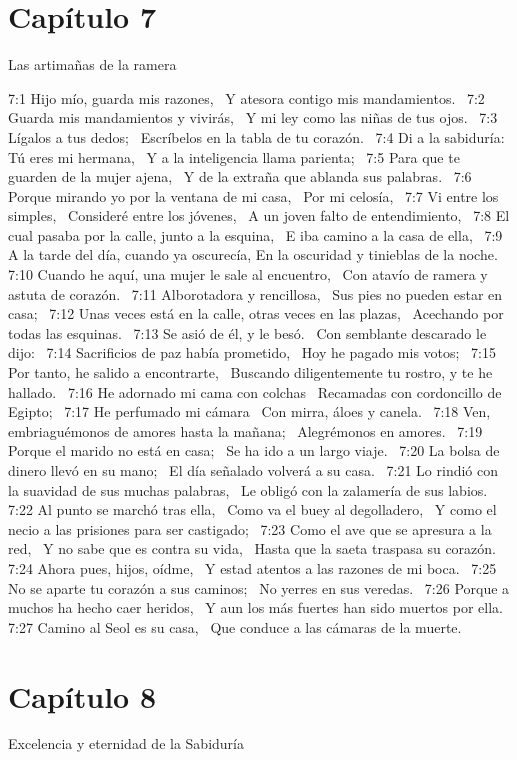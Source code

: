 \section*{Capítulo 7 }
Las artimañas de la ramera  

7:1 Hijo mío, guarda mis razones,  
Y atesora contigo mis mandamientos.  
7:2 Guarda mis mandamientos y vivirás,  
Y mi ley como las niñas de tus ojos.  
7:3 Lígalos a tus dedos;  
Escríbelos en la tabla de tu corazón.  
7:4 Di a la sabiduría: Tú eres mi hermana,  
Y a la inteligencia llama parienta;  
7:5 Para que te guarden de la mujer ajena,  
Y de la extraña que ablanda sus palabras.  
7:6 Porque mirando yo por la ventana de mi casa,  
Por mi celosía,  
7:7 Vi entre los simples,  
Consideré entre los jóvenes,  
A un joven falto de entendimiento,  
7:8 El cual pasaba por la calle, junto a la esquina,  
E iba camino a la casa de ella,  
7:9 A la tarde del día, cuando ya oscurecía, 
En la oscuridad y tinieblas de la noche.  
7:10 Cuando he aquí, una mujer le sale al encuentro,  
Con atavío de ramera y astuta de corazón.  
7:11 Alborotadora y rencillosa,  
Sus pies no pueden estar en casa;  
7:12 Unas veces está en la calle, otras veces en las plazas,  
Acechando por todas las esquinas.  
7:13 Se asió de él, y le besó.  
Con semblante descarado le dijo:  
7:14 Sacrificios de paz había prometido,  
Hoy he pagado mis votos;  
7:15 Por tanto, he salido a encontrarte,  
Buscando diligentemente tu rostro, y te he hallado.  
7:16 He adornado mi cama con colchas  
Recamadas con cordoncillo de Egipto;  
7:17 He perfumado mi cámara  
Con mirra, áloes y canela.  
7:18 Ven, embriaguémonos de amores hasta la mañana;  
Alegrémonos en amores.  
7:19 Porque el marido no está en casa;  
Se ha ido a un largo viaje.  
7:20 La bolsa de dinero llevó en su mano;  
El día señalado volverá a su casa.  
7:21 Lo rindió con la suavidad de sus muchas palabras,  
Le obligó con la zalamería de sus labios.  
7:22 Al punto se marchó tras ella,  
Como va el buey al degolladero,  
Y como el necio a las prisiones para ser castigado;  
7:23 Como el ave que se apresura a la red,  
Y no sabe que es contra su vida,  
Hasta que la saeta traspasa su corazón.  
7:24 Ahora pues, hijos, oídme,  
Y estad atentos a las razones de mi boca.  
7:25 No se aparte tu corazón a sus caminos;  
No yerres en sus veredas.  
7:26 Porque a muchos ha hecho caer heridos,  
Y aun los más fuertes han sido muertos por ella.  
7:27 Camino al Seol es su casa,  
Que conduce a las cámaras de la muerte.  
\section*{Capítulo 8 }
Excelencia y eternidad de la Sabiduría  

